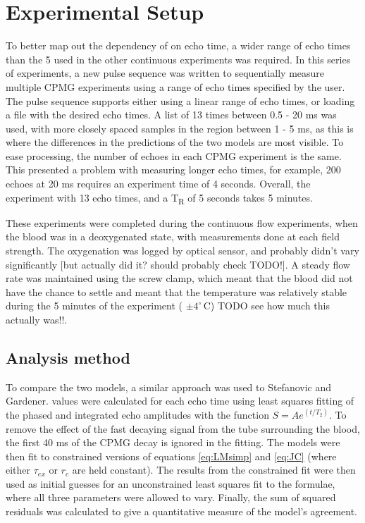 \section{Experimental Setup}
To better map out the dependency of \Ttwo on echo time, a wider range of echo times than the 5 used in the other continuous experiments was required.
In this series of experiments, a new pulse sequence  was written to sequentially measure multiple CPMG experiments using a range of echo times specified by the user.
The pulse sequence supports either using a linear range of echo times, or loading a file with the desired echo times.
A list of 13 times between 0.5 - 20 ms was used, with more closely spaced samples in the region between 1 - 5 ms, as this is where the differences in the predictions of the two models are most visible.
To ease processing, the number of echoes in each CPMG experiment is the same.
This presented a problem with measuring longer echo times, for example, 200 echoes at 20 ms requires an experiment time of 4 seconds.
Overall, the experiment with 13 echo times, and a T\textsubscript{R} of 5 seconds takes 5 minutes.

These experiments were completed during the continuous flow experiments, when the blood was in a deoxygenated state, with measurements done at each field strength.
The oxygenation was logged by optical sensor, and probably didn't vary significantly [but actually did it? should probably check TODO!].
A steady flow rate was maintained using the screw clamp, which meant that the blood did not have the chance to settle and meant that the temperature was relatively stable during the 5 minutes of the experiment ( \mbox{$\pm 4^{\circ}\, \mathrm{C}$}) TODO see how much this actually was!!.

\subsection*{Analysis method}
To compare the two models, a similar approach was used to Stefanovic\cite{StefanovicHumanwholebloodrelaxometry2004} and Gardener\cite{GardenerDependencebloodR22010}.
\Ttwo values were calculated for each echo time using least squares fitting of the phased and integrated echo amplitudes with the function $S=Ae^{(t/T_2)}$.
To remove the effect of the fast decaying signal from the tube surrounding the blood, the first 40 ms of the CPMG decay is ignored in the fitting.
The models were then fit to constrained versions of equations \ref{eq:LMsimp} and \ref{eq:JC}  (where either $\tau_{ex}$ or $r_c$ are held constant).
The results from the constrained fit were then used as initial guesses for an unconstrained least squares fit to the formulae, where all three parameters were allowed to vary.
Finally, the sum of squared residuals was calculated to give a quantitative measure of the model's agreement.

